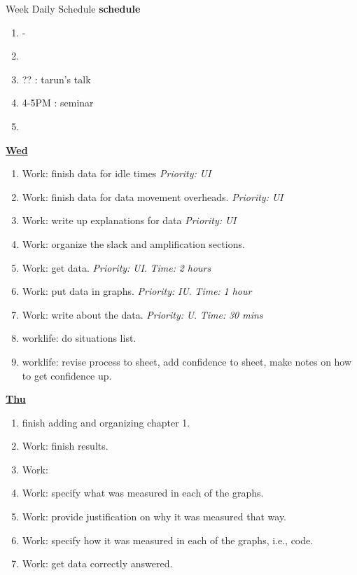 \documentclass[serif, mathserif, final]{beamer}
\newcommand{\timeEst}[1]{\textit{Time:} \textit{#1}}
\newcommand{\priority}[1]{\textit{Priority:} \textit{#1}}
\begin{document}
\begin{frame}{}
\begin{columns}
\begin{column}{0.50\linewidth}
\begin{block}{Week Daily Schedule}
  \textbf{schedule} 
  \begin{enumerate} 
    \tiny \item \tiny - 
    \item \tiny 
    \item \tiny  ?? : tarun's talk 

    \item \tiny 4-5PM : seminar 
      \item \tiny 
  \end{enumerate} 


  \textbf{\small {\underline{Wed}}}
  \begin{enumerate} 
    \tiny \item \tiny Work: finish data for idle times \priority{UI} 
  \item \tiny Work: finish data for data movement overheads. \priority{UI} 
  \item \tiny Work: write up explanations for data \priority{UI} 
  \item \tiny Work: organize the slack and amplification sections. 
    \tiny \item \tiny Work: get data. \priority{UI}. \timeEst{2 hours} 
  \item \tiny Work: put data in graphs. \priority{IU}. \timeEst{1 hour}
  \item \tiny Work: write about the data. \priority{U}. \timeEst{30 mins} 
  \item \tiny worklife: do situations list. 
  \item \tiny worklife: revise process to sheet, add confidence to sheet, make notes on how to get confidence up. 


  \end{enumerate} 
  
  \textbf{\small{\underline{Thu}}}
  \begin{enumerate} 
    \tiny \item \tiny finish adding and organizing chapter 1.  
  \item \tiny Work: finish results.  
  \item \tiny Work: 
    
  \item \tiny Work: specify what was measured in each of the graphs. 
  \item \tiny Work: provide justification on why it was measured that way. 
  \item \tiny Work: specify how it was measured in each of the graphs, i.e., code. 
  \item \tiny Work: get data correctly answered. 
    


\end{enumerate}
\end{block}
\end{column}
\end{columns}
\end{frame}
\end{document}
